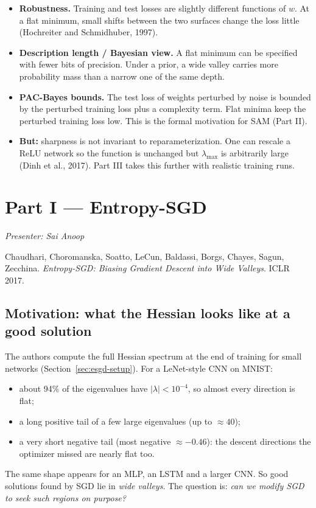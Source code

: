 \documentclass[11pt]{article}
\newcommand{\lmax}{\lambda_{\max}}
\newcommand{\presenter}[1]{\noindent\textit{Presenter: #1}\par\medskip}
\theoremstyle{plain}
\begin{document}
\begin{itemize}
  \item \textbf{Robustness.} Training and test losses are slightly different functions of $w$. At a flat minimum,
        small shifts between the two surfaces change the loss little (Hochreiter and Schmidhuber, 1997).
  \item \textbf{Description length / Bayesian view.} A flat minimum can be specified with fewer bits of precision. Under a prior,
        a wide valley carries more probability mass than a narrow one of the same depth.
  \item \textbf{PAC-Bayes bounds.} The test loss of weights perturbed by noise is bounded by the perturbed training loss plus a complexity
        term. Flat minima keep the perturbed training loss low. This is the formal motivation for SAM (Part II).
  \item \textbf{But:} sharpness is not invariant to reparameterization. One can rescale a ReLU network so the function is unchanged but $\lmax$
        is arbitrarily large (Dinh et al., 2017). Part III takes this further with realistic training runs.
\end{itemize}

\section{Part I --- Entropy-SGD}
\label{sec:esgd}
\presenter{Sai Anoop}

Chaudhari, Choromanska, Soatto, LeCun, Baldassi, Borgs, Chayes, Sagun, Zecchina. \emph{Entropy-SGD: Biasing Gradient Descent into Wide Valleys}. ICLR 2017.

\subsection{Motivation: what the Hessian looks like at a good solution}

The authors compute the full Hessian spectrum at the end of training for small networks (Section~\ref{sec:esgd-setup}).
For a LeNet-style CNN on MNIST:
\begin{itemize}
  \item about 94\% of the eigenvalues have $|\lambda| < 10^{-4}$, so almost every direction is flat;
  \item a long positive tail of a few large eigenvalues (up to $\approx 40$);
  \item a very short negative tail (most negative $\approx -0.46$): the descent directions the optimizer missed are nearly flat too.
\end{itemize}
The same shape appears for an MLP, an LSTM and a larger CNN. So good solutions found by SGD lie in \emph{wide valleys}.
The question is: \emph{can we modify SGD to seek such regions on purpose?}
\end{document}

